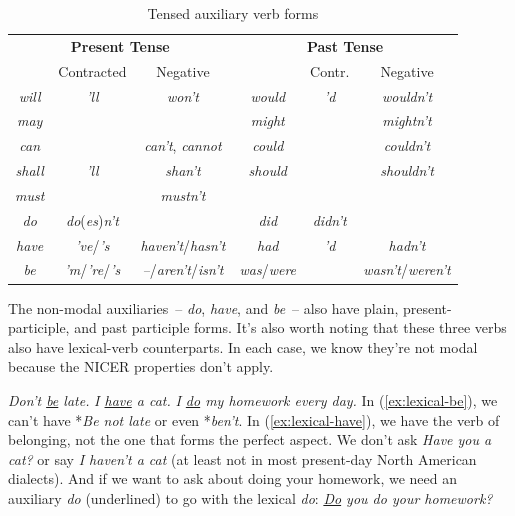 \begin{table}[ht]
    \centering
    \begin{tabular}{cccccc}
       
        \multicolumn{3}{c}{\textbf{Present Tense}} & \multicolumn{3}{c}{\textbf{Past Tense}} \\
         & Contracted & Negative &  & Contr. & Negative \\
        \textit{will} & \textit{'ll} & \textit{won't} & \textit{would} & \textit{'d} & \textit{wouldn't} \\ 
        \textit{may} & & & \textit{might} & & \textit{mightn't} \\ 
        \textit{can} & & \textit{can't}, \textit{cannot} & \textit{could} & & \textit{couldn't} \\ 
        \textit{shall} & \textit{'ll} & \textit{shan't} & \textit{should} & & \textit{shouldn't} \\ 
        \textit{must} & & \textit{mustn't} & & & \\
        \textit{do} & \textit{do}(\textit{es})\textit{n't} & & \textit{did} & \textit{didn't} & \\ 
        \textit{have} & \textit{'ve}/\textit{'s} & \textit{haven't}/\textit{hasn't} & \textit{had} & \textit{'d} & \textit{hadn't} \\ 
        \textit{be} & \textit{'m}/\textit{'re}/\textit{'s} & \textit{--}/\textit{aren't}/\textit{isn't} & \textit{was}/\textit{were} & & \textit{wasn't}/\textit{weren't} \\
    \end{tabular}
    \caption{Tensed auxiliary verb forms}
    \label{tab:modal-auxiliary-forms}
\end{table}

\noindent The non-modal auxiliaries~-- \textit{do}, \textit{have}, and \textit{be}~-- also have plain, present-participle, and past participle forms. It's also worth noting that these three verbs also have lexical-verb counterparts. In each case, we know they're not modal because the NICER properties don't apply.

\ea
\ea \textit{Don't \uline{be} late.}\label{ex:lexical-be}
\ex \textit{I \uline{have} a cat.}\label{ex:lexical-have}
\ex \textit{I \uline{do} my homework every day.}\label{ex:lexical-do}
\z\z
In (\ref{ex:lexical-be}), we can't have *\textit{Be not late} or even *\textit{ben't}. In (\ref{ex:lexical-have}), we have the verb of belonging, not the one that forms the perfect aspect. We don't ask \textit{Have you a cat?} or say \textit{I haven't a cat} (at least not in most present-day North American dialects). And if we want to ask about doing your homework, we need an auxiliary \textit{do} (underlined) to go with the lexical \textit{do}: \textit{\uline{Do} you do your homework?}

